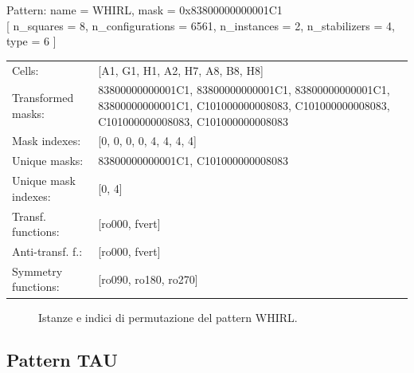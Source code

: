 \begin{tcolorbox}[sharp corners, fontupper=\ttfamily\small, colback=white]
  \noindent Pattern: name = WHIRL, mask = 0x83800000000001C1\\
  {[} n\_squares = 8, n\_configurations = 6561,
  n\_instances = 2, n\_stabilizers = 4, type = 6 { ]}\\[1.0ex]
  \begin{tabularx}{\textwidth}{@{} p{3.5cm} X @{}}
    Cells:               & {[}A1, G1, H1, A2, H7, A8, B8, H8{]}\\[0.5ex]
    Transformed masks:   & 83800000000001C1, 83800000000001C1, 83800000000001C1, 83800000000001C1, C101000000008083, C101000000008083, C101000000008083, C101000000008083\\[0.5ex]
    Mask indexes:        & {[}0, 0, 0, 0, 4, 4, 4, 4{]}\\[0.5ex]
    Unique masks:        & 83800000000001C1, C101000000008083\\[0.5ex]
    Unique mask indexes: & {[}0, 4{]}\\[0.5ex]
    Transf. functions:   & {[}ro000, fvert{]}\\[0.5ex]
    Anti-transf. f.:     & {[}ro000, fvert{]}\\[0.5ex]
    Symmetry functions:  & {[}ro090, ro180, ro270{]}\\[0.5ex]
  \end{tabularx}
\end{tcolorbox}

\begin{figure}[htbp]
  \centering
   \hfill
   \hfill
   \hfill
  \vspace{0.3cm}
   \hfill
   \hfill
   \hfill
  \caption{Istanze e indici di permutazione del pattern WHIRL.}
\end{figure}

\newpage

\subsection{Pattern TAU}

